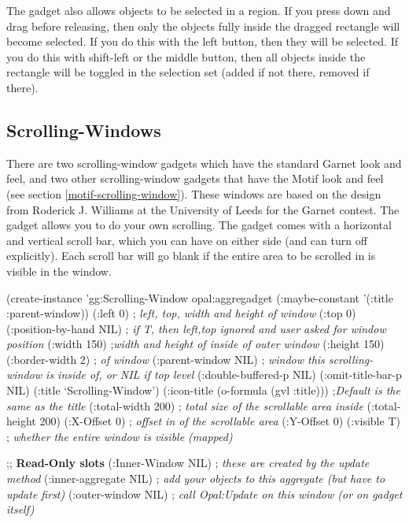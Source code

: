 The gadget also allows objects to be selected in a region.
If you press down and drag before releasing, then
only the objects fully inside the dragged rectangle will become
selected.  If you do this with the left button, then they will be
selected.  If you do this with shift-left or the middle button, then
all objects inside the rectangle will be toggled in the selection set
(added if not there, removed if there).


\begin{group}
\section{Scrolling-Windows}
\label{scrolling-windows}

There are two scrolling-window gadgets which have the standard Garnet
look and feel, and two other scrolling-window gadgets that have the
Motif look and feel (see section \ref{motif-scrolling-window}).
These windows are based on the design from Roderick J. Williams at
the University of Leeds for the Garnet contest.  The
 gadget allows you to do your own scrolling.  The
 gadget comes with a horizontal and
vertical scroll bar, which you can have on either side (and can turn
off explicitly).  Each scroll bar will go blank if the entire area to
be scrolled in is visible in the window.
\end{group}

\begin{center}
\end{center}

\begin{programexample}
(create-instance 'gg:Scrolling-Window opal:aggregadget
   (:maybe-constant '(:title :parent-window))
   (:left 0)  ; {\it left, top, width and height of window}
   (:top 0)
   (:position-by-hand NIL) ; {\it if T, then left,top ignored and user asked for window position}
   (:width 150) ;{\it width and height of inside of outer window}
   (:height 150)
   (:border-width 2) ; {\it of window}
   (:parent-window NIL) ; {\it window this scrolling-window is inside of, or NIL if top level}
   (:double-buffered-p NIL)
   (:omit-title-bar-p NIL)
   (:title `Scrolling-Window')
   (:icon-title (o-formula (gvl :title))) ;{\it Default is the same as the title}
   (:total-width 200)   ; {\it total size of the scrollable area inside}
   (:total-height 200)
   (:X-Offset 0)  ; {\it offset in of the scrollable area}
   (:Y-Offset 0)
   (:visible T)  ; {\it whether the entire window is visible (mapped)}

   ;; {\bf  Read-Only slots}
   (:Inner-Window NIL)  ; {\it these are created by the update method}
   (:inner-aggregate NIL) ; {\it add your objects to this aggregate (but have to update first)}
   (:outer-window NIL) ; {\it call Opal:Update on this window (or on gadget itself)}
\end{programexample}

